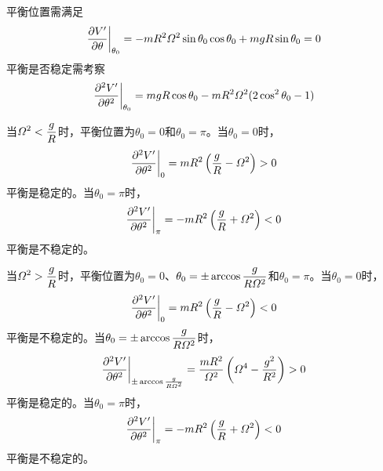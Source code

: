 \begin{solution}
平衡位置需满足
\begin{equation*}
	\frac{\partial V'}{\partial \theta}\bigg|_{\theta_0} = -mR^2 \mathnormal{\Omega}^2 \sin \theta_0 \cos \theta_0 + mgR \sin \theta_0 = 0
\end{equation*}
平衡是否稳定需考察
\begin{equation*}
	\frac{\partial^2 V'}{\partial \theta^2}\bigg|_{\theta_0} = mgR\cos \theta_0 - mR^2 \mathnormal{\Omega}^2 (2\cos^2 \theta_0-1)
\end{equation*}

当$\displaystyle \mathnormal{\Omega}^2 < \frac{g}{R}$时，平衡位置为$\theta_0 = 0$和$\theta_0 = \pi$。当$\theta_0 = 0$时，
\begin{equation*}
	\frac{\partial^2 V'}{\partial \theta^2}\bigg|_{0} = mR^2 \left(\frac{g}{R} - \mathnormal{\Omega}^2\right) > 0
\end{equation*}
平衡是稳定的。当$\theta_0 = \pi$时，
\begin{equation*}
	\frac{\partial^2 V'}{\partial \theta^2}\bigg|_{\pi} = -mR^2 \left(\frac{g}{R} + \mathnormal{\Omega}^2\right) < 0
\end{equation*}
平衡是不稳定的。

当$\displaystyle \mathnormal{\Omega}^2 > \frac{g}{R}$时，平衡位置为$\theta_0 = 0$、$\displaystyle \theta_0 = \pm \arccos \frac{g}{R\mathnormal{\Omega}^2}$和$\theta_0 = \pi$。当$\theta_0 = 0$时，
\begin{equation*}
	\frac{\partial^2 V'}{\partial \theta^2}\bigg|_{0} = mR^2 \left(\frac{g}{R} - \mathnormal{\Omega}^2\right) < 0
\end{equation*}
平衡是不稳定的。当$\displaystyle \theta_0 = \pm \arccos \frac{g}{R\mathnormal{\Omega}^2}$时，
\begin{equation*}
	\frac{\partial^2 V'}{\partial \theta^2}\bigg|_{\pm \arccos \frac{g}{R\mathnormal{\Omega}^2}} = \frac{mR^2}{\mathnormal{\Omega}^2} \left(\mathnormal{\Omega}^4-\frac{g^2}{R^2}\right) > 0
\end{equation*}
平衡是稳定的。当$\theta_0 = \pi$时，
\begin{equation*}
	\frac{\partial^2 V'}{\partial \theta^2}\bigg|_{\pi} = -mR^2 \left(\frac{g}{R} + \mathnormal{\Omega}^2\right) < 0
\end{equation*}
平衡是不稳定的。
\end{solution}

